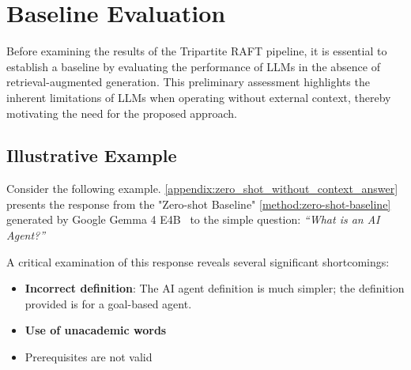 \section{Baseline Evaluation}
\label{sec:baseline}

Before examining the results of the Tripartite RAFT pipeline,
it is essential to establish a baseline by evaluating the performance of LLMs in the absence of retrieval-augmented generation.
This preliminary assessment highlights the inherent limitations of LLMs when operating without external context, thereby motivating the need for the proposed approach.

\subsection{Illustrative Example}

Consider the following example. \ref{appendix:zero_shot_without_context_answer} presents the response from the "Zero-shot Baseline" \ref{method:zero-shot-baseline} generated by Google Gemma 4 E4B~\cite{gemmateam2026gemma4technicalreport} to the simple question: \emph{``What is an AI Agent?''}

A critical examination of this response reveals several significant shortcomings:

\begin{itemize}
    \item \textbf{Incorrect definition}: The AI agent definition is much simpler; the definition provided is for a goal-based agent.
    \item \textbf{Use of unacademic words}
    \item Prerequisites are not valid
\end{itemize}

